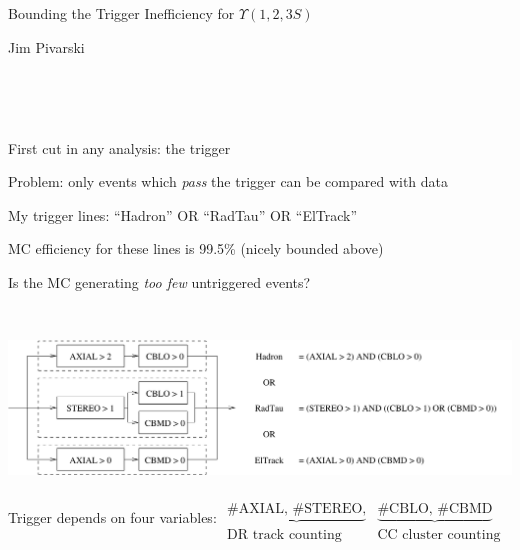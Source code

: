 \documentclass[landscape]{article}
\begin{document}
\huge
\renewcommand{\labelitemi}{-}
\setlength{\parindent}{0 cm}

\mbox{ }

\vfill

\mbox{ }

\vfill

\begin{center}
  Bounding the Trigger Inefficiency for $\Upsilon(1,2,3S)$

  \vfill

  Jim Pivarski
\end{center}

\vfill

\mbox{ }

\vfill

\pagebreak

\mbox{ }

\vfill

First cut in any analysis: the trigger

\vfill

Problem: only events which {\it pass} the trigger can be compared with
data

\vfill

My trigger lines: ``Hadron'' OR ``RadTau'' OR ``ElTrack''

\vfill

MC efficiency for these lines is 99.5\% (nicely bounded above)

\vfill

Is the MC generating {\it too few} untriggered events?

\vfill

\pagebreak

\mbox{ }

\vfill

\begin{center}
  \includegraphics[width=\linewidth]{triggercuts.pdf}
\end{center}

\vfill

Trigger depends on four variables: $\begin{array}{c} \\ \underbrace{\mbox{\#AXIAL, \#STEREO,}} \\ \mbox{DR track counting} \end{array} \begin{array}{c} \\ \underbrace{\mbox{\#CBLO, \#CBMD}} \\ \mbox{CC cluster counting} \end{array}$
\end{document}

